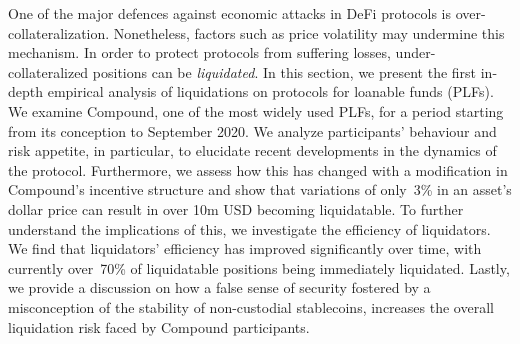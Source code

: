 One of the major defences against economic attacks in DeFi protocols is over-collateralization.
Nonetheless, factors such as price volatility may undermine this mechanism. 
In order to protect protocols from suffering losses, under-collateralized positions can be \textit{liquidated}.
In this section, we present the first in-depth empirical analysis of liquidations on protocols for loanable funds (PLFs).
We examine Compound, one of the most widely used PLFs, for a period starting from its conception to September 2020.
We analyze participants' behaviour and risk appetite, in particular, to elucidate recent developments in the dynamics of the protocol.
Furthermore, we assess how this has changed with a modification in Compound's incentive structure and show that variations of only~3\% in an asset's dollar price can result in over 10m USD becoming liquidatable.
To further understand the implications of this, we investigate the efficiency of liquidators.
We find that liquidators' efficiency has improved significantly over time, with currently over~70\% of liquidatable positions being immediately liquidated.
Lastly, we provide a discussion on how a false sense of security fostered by a misconception of the stability of non-custodial stablecoins, increases the overall liquidation risk faced by Compound participants.
